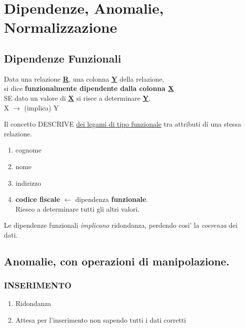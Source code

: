 \documentclass[a4paper, 12pt]{report}
\begin{document}
   \section{Dipendenze, Anomalie, Normalizzazione}
   \subsection{Dipendenze Funzionali}
   \begin{center}
       Data una relazione \textbf{\underline{R}}, una colonna \textbf{\underline{Y}} della relazione,\\ si dice \textbf{funzionalmente dipendente dalla colonna \underline{X}} \\ SE dato un valore di \textbf{\underline{X}} si risce a determinare \textbf{\underline{Y}}.\\
       X \( \rightarrow \) (implica) Y \\
    \end{center} 
    
    Il concetto DESCRIVE \underline{dei legami di tipo funzionale} tra attributi di una stessa relazione. \\
   \begin{enumerate}
       \item cognome
       \item nome
       \item indirizzo
       \item \textbf{codice fiscale} \(\leftarrow\) dipendenza \textbf{funzionale}.\\ Riesco a determinare tutti gli altri valori. 
   \end{enumerate}
   
   Le dipendenze funzionali \textit{implicano} ridondanza, perdendo cosi' la \textit{coerenza} dei dati.
   
   \subsection{Anomalie, con operazioni di manipolazione.}
   \subsubsection{INSERIMENTO}
   \begin{enumerate}
       \item Ridondanza
       \item Attesa per l'inserimento non sapendo tutti i dati corretti
   \end{enumerate}
\end{document}
